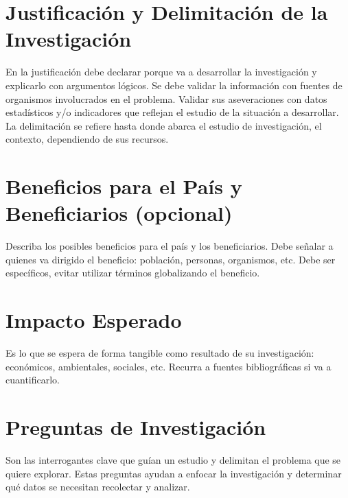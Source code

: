 \documentclass[12pt,a4paper]{article}
\begin{document}
\section{Justificación y Delimitación de la Investigación}
\noindent
En la justificación debe declarar porque va a desarrollar la investigación y explicarlo
con argumentos lógicos. Se debe validar la información con fuentes de organismos
involucrados en el problema. Validar sus aseveraciones con datos estadísticos y/o
indicadores que reflejan el estudio de la situación a desarrollar.
La delimitación se refiere hasta donde abarca el estudio de investigación, el contexto,
dependiendo de sus recursos.

\section{Beneficios para el País y Beneficiarios (opcional)}
\noindent
Describa los posibles beneficios para el país y los beneficiarios. Debe señalar a
quienes va dirigido el beneficio: población, personas, organismos, etc. Debe ser
específicos, evitar utilizar términos globalizando el beneficio.

\section{Impacto Esperado}
\noindent
Es lo que se espera de forma tangible como resultado de su investigación:
económicos, ambientales, sociales, etc. Recurra a fuentes bibliográficas si va a
cuantificarlo.


\section{Preguntas de Investigación}
\noindent
Son las interrogantes clave que guían un estudio y delimitan el problema que se quiere explorar. Estas preguntas ayudan a enfocar la investigación y determinar qué datos se necesitan recolectar y analizar.
\end{document}
